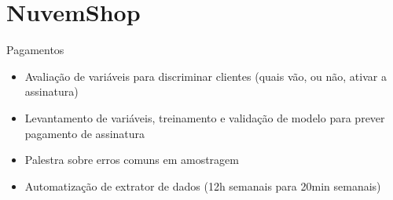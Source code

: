 \section{NuvemShop}

\begin{frame}	
	\begin{block}{Pagamentos}	
		\begin{itemize}
			\item Avaliação de variáveis para discriminar clientes (quais vão, ou não, ativar a assinatura)
			\item Levantamento de variáveis, treinamento e validação de modelo para prever pagamento de assinatura
			\item Palestra sobre erros comuns em amostragem
			\item Automatização de extrator de dados (12h semanais para 20min semanais)
		\end{itemize}		
	\end{block}
\end{frame}

